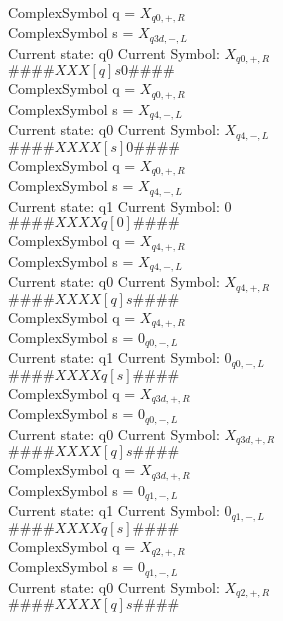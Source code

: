 \documentclass[10pt, a4paper]{article}
\begin{document}
ComplexSymbol q = $X_{q0,+,R}$ \\
ComplexSymbol s = $X_{q3d,-,L}$ \\ 
 \medskip
Current state: q0	 Current Symbol: 	 $X_{q0,+,R}$\\
$\# \#\# \# X X X [ q ] s 0 \# \# \# \# $ \\
ComplexSymbol q = $X_{q0,+,R}$ \\
ComplexSymbol s = $X_{q4,-,L}$ \\ 
 \medskip
Current state: q0	 Current Symbol: 	 $X_{q4,-,L}$\\
$\# \#\# \# X X X X [ s ] 0 \# \# \# \# $ \\
ComplexSymbol q = $X_{q0,+,R}$ \\
ComplexSymbol s = $X_{q4,-,L}$ \\ 
 \medskip
Current state: q1	 Current Symbol: 	 $0$\\
$\# \#\# \# X X X X q [ 0 ] \# \# \# \# $ \\
ComplexSymbol q = $X_{q4,+,R}$ \\
ComplexSymbol s = $X_{q4,-,L}$ \\ 
 \medskip
Current state: q0	 Current Symbol: 	 $X_{q4,+,R}$\\
$\# \#\# \# X X X X [ q ] s \# \# \# \# $ \\
ComplexSymbol q = $X_{q4,+,R}$ \\
ComplexSymbol s = $0_{q0,-,L}$ \\ 
 \medskip
Current state: q1	 Current Symbol: 	 $0_{q0,-,L}$\\
$\# \#\# \# X X X X q [ s ] \# \# \# \# $ \\
ComplexSymbol q = $X_{q3d,+,R}$ \\
ComplexSymbol s = $0_{q0,-,L}$ \\ 
 \medskip
Current state: q0	 Current Symbol: 	 $X_{q3d,+,R}$\\
$\# \#\# \# X X X X [ q ] s \# \# \# \# $ \\
ComplexSymbol q = $X_{q3d,+,R}$ \\
ComplexSymbol s = $0_{q1,-,L}$ \\ 
 \medskip
Current state: q1	 Current Symbol: 	 $0_{q1,-,L}$\\
$\# \#\# \# X X X X q [ s ] \# \# \# \# $ \\
ComplexSymbol q = $X_{q2,+,R}$ \\
ComplexSymbol s = $0_{q1,-,L}$ \\ 
 \medskip
Current state: q0	 Current Symbol: 	 $X_{q2,+,R}$\\
$\# \#\# \# X X X X [ q ] s \# \# \# \# $ \\
\end{document}
